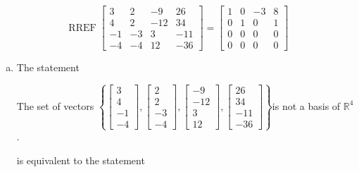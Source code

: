 \begin{exerciseAnswer} 


\[\operatorname{RREF} \left[\begin{array}{cccc}
3 & 2 & -9 & 26 \\
4 & 2 & -12 & 34 \\
-1 & -3 & 3 & -11 \\
-4 & -4 & 12 & -36
\end{array}\right] = \left[\begin{array}{cccc}
1 & 0 & -3 & 8 \\
0 & 1 & 0 & 1 \\
0 & 0 & 0 & 0 \\
0 & 0 & 0 & 0
\end{array}\right] \]


\begin{enumerate}[(a)]
\item The statement 
\begin{center}\begin{minipage}{0.8\textwidth}
 The set of vectors \( \left\{ \left[\begin{array}{c}
3 \\
4 \\
-1 \\
-4
\end{array}\right] , \left[\begin{array}{c}
2 \\
2 \\
-3 \\
-4
\end{array}\right] , \left[\begin{array}{c}
-9 \\
-12 \\
3 \\
12
\end{array}\right] , \left[\begin{array}{c}
26 \\
34 \\
-11 \\
-36
\end{array}\right] \right\} \)is not a basis of \(\mathbb{R}^4\). 
\end{minipage}\end{center}
     is equivalent to the statement 
\begin{center}\begin{minipage}{0.8\textwidth}
 The set of vectors \( \left\{ \left[\begin{array}{c}
3 \\

\end{array}
\end{minipage}
\end{center}
\end{enumerate}
\end{exerciseAnswer}
